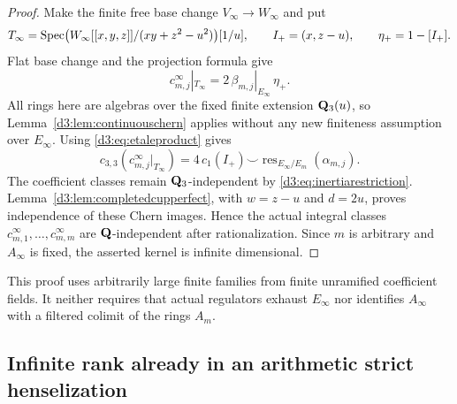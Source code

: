 \begin{proof}
Make the finite free base change $V_\infty\to W_\infty$ and put
\[
 T_\infty=\operatorname{Spec}
 \bigl(W_\infty[[x,y,z]]/(xy+z^2-u^2)\bigr)[1/u],
 \qquad I_+=(x,z-u),\qquad \eta_+=1-[I_+].
\]
Flat base change and the projection formula give
\[
 c^\infty_{m,j}|_{T_\infty}
      =2\,\beta_{m,j}|_{E_\infty}\,\eta_+.
\]
All rings here are algebras over the fixed finite extension
$\mathbf Q_3(u)$, so Lemma~\ref{d3:lem:continuouschern} applies without any
new finiteness assumption over $E_\infty$.
Using \eqref{d3:eq:etaleproduct} gives
\[
 c_{3,3}(c^\infty_{m,j}|_{T_\infty})
   =4\,c_1(I_+)\smile
       \operatorname{res}_{E_\infty/E_m}(\alpha_{m,j}).
\]
The coefficient classes remain $\mathbf Q_3$-independent by
\eqref{d3:eq:inertiarestriction}. Lemma~\ref{d3:lem:completedcupperfect},
with $w=z-u$ and $d=2u$, proves independence of these Chern images.
Hence the actual integral classes $c^\infty_{m,1},\ldots,
c^\infty_{m,m}$ are $\mathbf Q$-independent after rationalization.
Since $m$ is arbitrary and $A_\infty$ is fixed, the asserted kernel
is infinite dimensional.
\end{proof}

\begin{remark}
This proof uses arbitrarily large finite families from finite
unramified coefficient fields. It neither requires that actual
regulators exhaust $E_\infty$ nor identifies $A_\infty$ with a
filtered colimit of the rings $A_m$.
\end{remark}


\subsection{Infinite rank already in an arithmetic strict henselization}
\label{d3:sec:stricthenseldescent}

